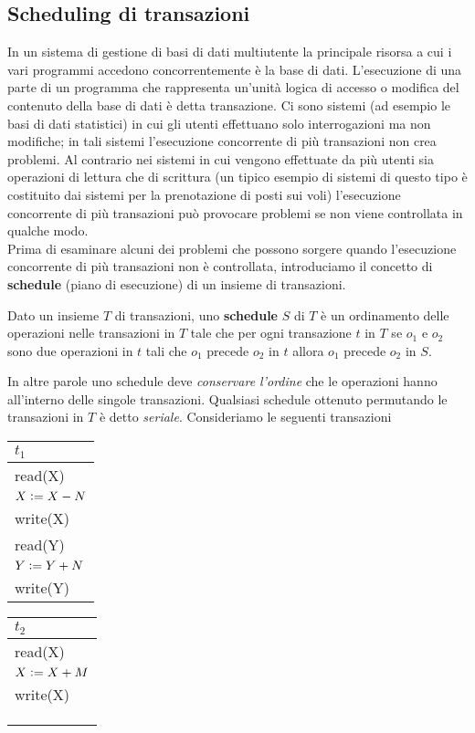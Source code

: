 \subsection{Scheduling di transazioni}
In un sistema di gestione di basi di dati multiutente la principale risorsa a cui i vari programmi
accedono concorrentemente è la base di dati. L'esecuzione di una parte di un programma che
rappresenta un'unità logica di accesso o modifica del contenuto della base di dati è detta
transazione. Ci sono sistemi (ad esempio le basi di dati statistici) in cui gli utenti effettuano solo
interrogazioni ma non modifiche; in tali sistemi l'esecuzione concorrente di più transazioni non crea
problemi. Al contrario nei sistemi in cui vengono effettuate da più utenti sia operazioni di lettura
che di scrittura (un tipico esempio di sistemi di questo tipo è costituito dai sistemi per la
prenotazione di posti sui voli) l'esecuzione concorrente di più transazioni può provocare problemi
se non viene controllata in qualche modo.\\
Prima di esaminare alcuni dei problemi che possono sorgere quando l'esecuzione concorrente di più
transazioni non è controllata, introduciamo il concetto di \textbf{schedule} (piano di esecuzione) di un
insieme di transazioni.
\begin{defn}
Dato un insieme $T$ di transazioni, uno \textbf{schedule} $S$ di $T$ è un ordinamento delle
operazioni nelle transazioni in $T$ tale che per ogni transazione $t$ in $T$ se $o_1$ e $o_2$ sono due operazioni
in $t$ tali che $o_1$ precede $o_2$ in $t$ allora $o_1$ precede $o_2$ in $S$.
\end{defn}
In altre parole uno schedule deve \emph{conservare l'ordine} che le operazioni hanno all'interno delle singole 
transazioni. Qualsiasi schedule ottenuto permutando le transazioni in $T$ è detto \emph{seriale}.
Consideriamo le seguenti transazioni

\begin{multicols}{2}   
 \begin{tabular}{|l|}
     \hline
     $t_1$\\
     \hline
     read(X)\\ 
     $X\vcentcolon=X-N$\\ 
     write(X)\\ 
     read(Y)\\
     $Y\vcentcolon=Y+N$\\
     write(Y)\\
     \hline
    \end{tabular}  
    
  \begin{tabular}{|l|}
    \hline
     $t_2$\\
     \hline
     read(X)\\ 
     $X\vcentcolon=X+M$\\ 
     write(X)\\
     \\
     \\
     \hline\\
    \end{tabular}
  \end{multicols}
  
